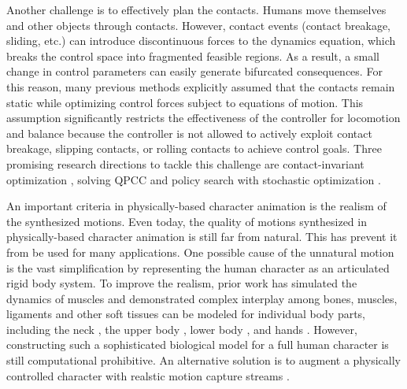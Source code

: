 Another challenge is to effectively plan the contacts. Humans move themselves and other objects through contacts. However, contact events (contact breakage, sliding, etc.) can introduce discontinuous forces to the dynamics equation, which breaks the control space into fragmented feasible regions. As a result, a small change in control parameters can easily generate bifurcated consequences. For this reason, many previous methods
explicitly assumed that the contacts remain static
\cite{Abe:2007,Jain:2009,Kim:2011:DCO} while optimizing control forces
subject to equations of motion. This assumption significantly
restricts the effectiveness of the controller for locomotion and balance
because the controller is not allowed to actively exploit contact
breakage, slipping contacts, or rolling contacts to achieve control
goals. Three promising research directions to tackle this challenge are contact-invariant optimization \cite{Mordatch:2012,Mordatch:2013}, solving QPCC \cite{} and policy search with stochastic optimization \cite{Wu:2010:TAB,Wang:2010,Mordatch:2010:RPL}.

An important criteria in physically-based character animation is the realism of the synthesized motions. Even today, the quality of motions synthesized in physically-based character animation is still far from natural. This has prevent it from be used for many applications. One possible cause of the unnatural motion is the vast simplification by representing the human character as an articulated rigid body system. To improve the realism, prior work has simulated the dynamics of muscles and demonstrated complex interplay among bones, muscles, ligaments and other soft tissues can be modeled for individual body parts, including
the neck \cite{Lee:2006}, the upper body \cite{Zordan:2006,Dilorenzo:2008,Lee:2009:CBM}, lower body \cite{}, and hands
\cite{Tsang:2005,Sueda:2008}. However, constructing such a sophisticated biological model for a full human character is still computational prohibitive. An alternative solution is to augment a physically controlled character with realstic motion capture streams \cite{}. 














